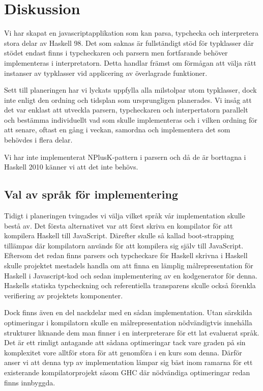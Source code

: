 \section{Diskussion}
Vi har skapat en javascriptapplikation som kan parsa, typchecka och interpretera stora delar av Haskell 98. Det som saknas är fullständigt stöd för typklasser där stödet endast finns i typcheckaren och parsern men fortfarande behöver implementeras i interpretatorn. Detta handlar främst om förmågan att välja rätt instanser av typklasser vid applicering av överlagrade funktioner.

Sett till planeringen har vi lyckats uppfylla alla milstolpar utom typklasser, dock inte enligt den ordning och tidsplan som ursprungligen planerades. 
Vi insåg att det var enklast att utveckla parsern, typcheckaren och interpertatorn parallelt och bestämma individuellt vad som skulle implementeras och i 
vilken ordning för att senare, oftast en gång i veckan, samordna och implementera det som behövdes i flera delar.

Vi har inte implementerat NPlusK-pattern i parsern och då de är borttagna i Haskell 2010 \citep{haskell2010} känner vi att det inte behövs.

\subsection{Val av språk för implementering}
Tidigt i planeringen tvingades vi välja vilket språk vår implementation skulle
bestå av. Det första alternativet var att först skriva en kompilator för att
kompilera Haskell till JavaScript. Därefter skulle så kallad boot-strapping
tillämpas där kompilatorn används för att kompilera sig själv till
JavaScript. Eftersom det redan finns parsers och typcheckare för Haskell
skrivna i Haskell skulle projektet mestadels handla om att finna en lämplig
målrepresentation för Haskell i Javascript-kod och sedan implementering av en
kodgenerator för denna. Haskells statiska typcheckning och referentiella
transparens skulle också förenkla verifiering av projektets komponenter.

Dock finns även en del nackdelar med en sådan implementation. Utan särskilda
optimeringar i kompilatorn skulle en målrepresentation nödvändigtvis innehålla
strukturer liknande dem man finner i en interpreterare för ett lat evaluerat
språk. Det är ett rimligt antagande att sådana optimeringar tack vare graden
på sin komplexitet vore alltför stora för att genomföra i en kurs som
denna. Därför anser vi att denna typ av implementation lämpar sig bäst inom
ramarna för ett existerande kompilatorprojekt såsom GHC där nödvändiga optimeringar redan finns innbyggda.

